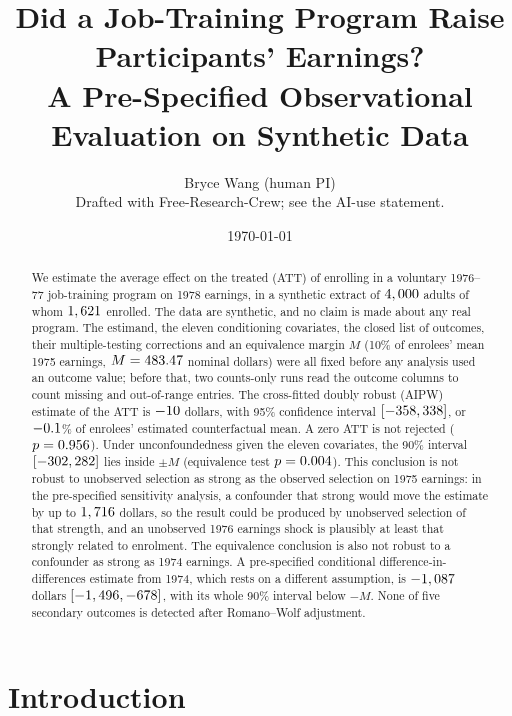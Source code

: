\documentclass[11pt]{article}
\title{Did a Job-Training Program Raise Participants' Earnings?\\
A Pre-Specified Observational Evaluation on Synthetic Data}
\author{Bryce Wang (human PI) \\ \small Drafted with Free-Research-Crew; see the AI-use statement.}
\date{\today}
\newcommand{\ci}[2]{$[#1, #2]$}
\begin{document}
\maketitle

\begin{abstract}
We estimate the average effect on the treated (ATT) of enrolling in a voluntary 1976--77
job-training program on 1978 earnings, in a synthetic extract of $4,000$ adults of
whom $1,621$ enrolled. The data are synthetic, and no claim is made about any
real program. The estimand, the eleven conditioning covariates, the closed list of outcomes,
their multiple-testing corrections and an equivalence margin $M$ (10\% of enrolees' mean
1975 earnings, $M = 483.47$ nominal dollars) were all fixed before any analysis used an
outcome value; before that, two counts-only runs read the outcome columns to count missing
and out-of-range entries. The cross-fitted doubly robust (AIPW) estimate of the ATT is $-10$ dollars,
with 95\% confidence interval \ci{\PrimaryCILow}{\PrimaryCIHigh}, or $-0.1$\%
of enrolees' estimated counterfactual mean. A zero ATT is not rejected ($p = 0.956$).
Under unconfoundedness given the eleven covariates, the 90\% interval
\ci{\PrimaryCINinetyLow}{\PrimaryCINinetyHigh} lies inside $\pm M$ (equivalence test
$p = 0.004$). This conclusion is not robust to unobserved selection as strong as
the observed selection on 1975 earnings: in the pre-specified
sensitivity analysis, a confounder that strong would move the estimate by up to
$1,716$ dollars, so the result could be produced by unobserved
selection of that strength, and an unobserved 1976 earnings shock is plausibly at least
that strongly related to enrolment. The equivalence conclusion is also not robust to a
confounder as strong as 1974 earnings. A pre-specified conditional difference-in-differences
estimate from 1974, which rests on a different assumption, is $-1,087$
dollars \ci{\DiffSeventyFourCILow}{\DiffSeventyFourCIHigh}, with its whole 90\% interval
below $-M$. None of five secondary outcomes is detected after Romano--Wolf adjustment.
\end{abstract}

\section{Introduction}
\end{document}
